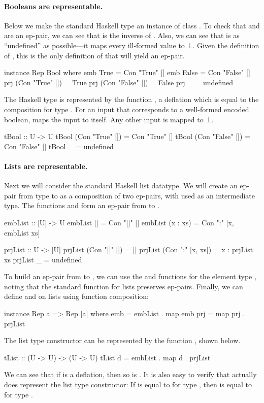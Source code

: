 \paragraph{Booleans are representable.} Below we make the standard Haskell type  an instance of class . To check that  and  are an ep-pair, we can see that  is the inverse of . Also, we can see that  is as ``undefined'' as possible---it maps every ill-formed value to $\bot$. Given the definition of , this is the only definition of  that will yield an ep-pair.
%
\begin{hscode}
instance Rep Bool where
  emb True             = Con "True" []
  emb False            = Con "False" []
  prj (Con "True" [])  = True
  prj (Con "False" []) = False
  prj _                = undefined
\end{hscode}
%
The Haskell type  is represented by the function , a deflation which is equal to the composition  for type . For an input that corresponds to a well-formed encoded boolean,  maps the input to itself. Any other input is mapped to $\bot$.
%
\begin{hscode}
tBool :: U -> U
tBool (Con "True" [])  = Con "True" []
tBool (Con "False" []) = Con "False" []
tBool _                = undefined
\end{hscode}

\paragraph{Lists are representable.} Next we will consider the standard Haskell list data\-type. We will create an ep-pair from type \hs{[a]} to  as a composition of two ep-pairs, with \hs{[U]} used as an intermediate type. The functions  and  form an ep-pair from \hs{[U]} to .
%
\begin{hscode}
embList :: [U] -> U
embList []       = Con "[]" []
embList (x : xs) = Con ":" [x, embList xs]

prjList :: U -> [U]
prjList (Con "[]" [])     = []
prjList (Con ":" [x, xs]) = x : prjList xs
prjList _                 = undefined
\end{hscode}
%
To build an ep-pair from \hs{[a]} to \hs{[U]}, we can use the  and  functions for the element type , noting that the standard  function for lists preserves ep-pairs. Finally, we can define  and  on lists using function composition:
%
\begin{hscode}
instance Rep a => Rep [a] where
  emb = embList . map emb
  prj = map prj . prjList
\end{hscode}
%
The list type constructor can be represented by the function , shown below. 
%
\begin{hscode}
tList :: (U -> U) -> (U -> U)
tList d = embList . map d . prjList
\end{hscode}
%
We can see that if  is a deflation, then so is . It is also easy to verify that  actually does represent the list type constructor: If  is equal to  for type ,  then  is equal to  for type \hs{[a]}.

